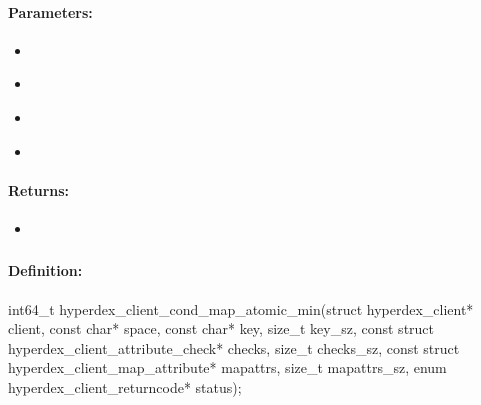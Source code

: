 \paragraph{Parameters:}
\begin{itemize}[noitemsep]
\item {}\\

\item {}\\

\item {}\\

\item {}\\

\end{itemize}

\paragraph{Returns:}
\begin{itemize}[noitemsep]
\item {}\\

\end{itemize}

\pagebreak
\subsubsection{}
\label{api:c:cond_map_atomic_min}


\paragraph{Definition:}
\begin{ccode}
int64_t hyperdex_client_cond_map_atomic_min(struct hyperdex_client* client,
        const char* space,
        const char* key, size_t key_sz,
        const struct hyperdex_client_attribute_check* checks, size_t checks_sz,
        const struct hyperdex_client_map_attribute* mapattrs, size_t mapattrs_sz,
        enum hyperdex_client_returncode* status);
\end{ccode}

